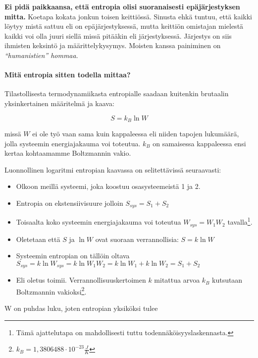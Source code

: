 \documentclass[12pt,a4paper,finnish]{book}
\begin{document}
\textbf{Ei pidä paikkaansa, että entropia olisi suoranaisesti epäjärjestyksen mitta.} Koetapa kokata jonkun 
toisen keittiössä. Sinusta ehkä tuntuu, että kaikki löytyy mistä sattuu eli on epäjärjestyksessä, mutta keittiön 
omistajan mielestä kaikki voi olla juuri siellä missä pitääkin eli järjestyksessä. Järjestys on siis ihmisten 
keksintö ja määrittelykysymys. Moisten kanssa painiminen on \textit{``humanistien'' hommaa}.

\paragraph{Mitä entropia sitten todella mittaa?}

Tilastollisesta termodynamiikasta entropialle saadaan kuitenkin brutaalin yksinkertainen määritelmä ja kaava:

\begin{equation}
\label{eqn:S}
 S = k_B \ln W
\end{equation}

missä $W$ ei ole työ vaan sama kuin kappaleessa  eli niiden tapojen lukumäärä, jolla 
systeemin energiajakauma voi toteutua. $k_B$ on samaisessa kappaleessa ensi kertaa kohtaamamme Boltzmannin vakio.

Luonnollinen logaritmi entropian kaavassa on selitettävissä seuraavasti:

\begin{itemize}
 \item Olkoon meillä systeemi, joka koostuu osasysteemeistä 1 ja 2.
 \item Entropia on ekstensiivisuure jolloin $S_{sys} = S_1 + S_2$
 \item Toisaalta koko systeemin energiajakauma voi toteutua $W_{sys} = W_1W_2$ tavalla\footnote{Tämä ajattelutapa 
 on mahdollisesti tuttu todennäköisyyslaskennasta.}.
 \item Oletetaan että $S$ ja $\ln W$ ovat suoraan verrannollisia: $S = k \ln W$
 \item Systeemin entropian on tällöin oltava\\ $S_{sys} = k\ln W_{sys} = k\ln W_1W_2 = k \ln W_1 + k \ln W_2 = S_1 + S_2$
 \item Eli oletus toimii. Verrannollisuuskertoimen $k$ mitattua arvoa $k_B$ kutsutaan Boltzmannin 
	vakioksi\footnote{$k_B = 1,3806488\cdot10^{-23}\frac{J}{K}$}.
\end{itemize}

W on puhdas luku, joten entropian yksiköksi tulee
\end{document}
